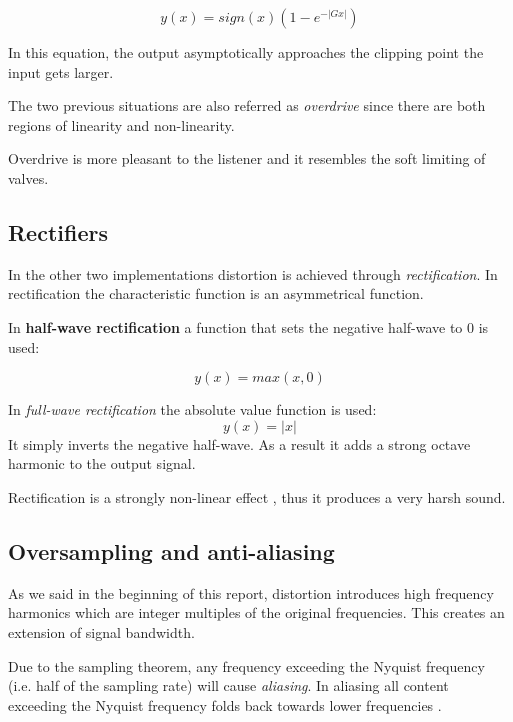 \documentclass[letterpaper, 12pt]{article}
\begin{document}
	\begin{equation}
		y(x) = sign(x) ( 1 - e^{-|Gx|} )
	\end{equation}
	
	In this equation, the output asymptotically approaches the clipping point the input gets larger.
	
	The two previous situations are also referred as \textit{overdrive} since there are both regions of linearity and non-linearity.
	
	Overdrive is more pleasant to the listener and it resembles the soft limiting of valves.
	
	
	\subsection*{Rectifiers}
	In the other two implementations distortion is achieved through \textit{rectification}. In rectification the characteristic function is an asymmetrical function.
	
	In \textbf{half-wave rectification} a function that sets the negative half-wave to 0 is used:
	
	\begin{equation}
		y(x) = max(x,0)
	\end{equation}
	
	In \textit{full-wave rectification} the absolute value function is used:
	\begin{equation}
		y(x) = |x|
	\end{equation}
	It simply inverts the negative half-wave. As a result it adds a  strong octave harmonic to the output signal.
	
	Rectification is a strongly non-linear effect , thus it produces a very harsh sound. 
	
	\subsection*{Oversampling and anti-aliasing}
	
	As we said in the beginning of this report, distortion introduces high frequency harmonics which are integer multiples of the original frequencies. This creates an extension of signal bandwidth. 
	
	Due to the sampling theorem, any frequency exceeding the Nyquist frequency (i.e. half of the sampling rate) will cause \textit{aliasing}. In aliasing all content exceeding the Nyquist frequency folds back towards lower frequencies \cite{oversampling}.
	
\end{document}
